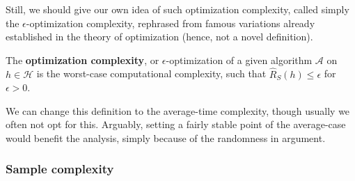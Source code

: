 Still, we should give our own idea of such optimization complexity, called simply the $\epsilon$-optimization complexity, rephrased from famous variations already established in the theory of optimization (hence, not a novel definition). 

\begin{definition}
  The \textbf{optimization complexity}, or $\epsilon$-optimization of a given algorithm $\mathcal{A}$ on $h\in \mathcal{H}$ is the worst-case computational complexity, such that $\hat{R}_{S}(h)\leq \epsilon$ for $\epsilon >0$. 
\end{definition}

We can change this definition to the average-time complexity, though usually we often not opt for this. Arguably, setting a fairly stable point of the average-case would benefit the analysis, simply because of the randomness in argument. 

\subsubsection{Sample complexity}

